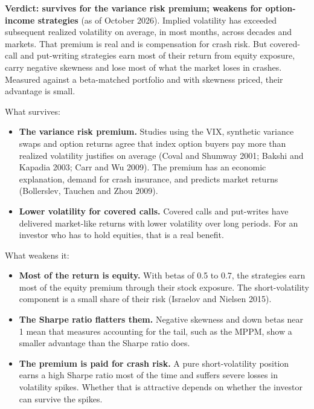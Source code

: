 \begin{callout}
\textbf{Verdict: survives for the variance risk premium; weakens for option-income strategies} (as of October 2026). Implied volatility has exceeded subsequent realized volatility on average, in most months, across decades and markets. That premium is real and is compensation for crash risk. But covered-call and put-writing strategies earn most of their return from equity exposure, carry negative skewness and lose most of what the market loses in crashes. Measured against a beta-matched portfolio and with skewness priced, their advantage is small.
\end{callout}

What survives:

\begin{itemize}
  \item \textbf{The variance risk premium.} Studies using the VIX, synthetic variance swaps and option returns agree that index option buyers pay more than realized volatility justifies on average (Coval and Shumway 2001; Bakshi and Kapadia 2003; Carr and Wu 2009). The premium has an economic explanation, demand for crash insurance, and predicts market returns (Bollerslev, Tauchen and Zhou 2009).
  \item \textbf{Lower volatility for covered calls.} Covered calls and put-writes have delivered market-like returns with lower volatility over long periods. For an investor who has to hold equities, that is a real benefit.
\end{itemize}

What weakens it:

\begin{itemize}
  \item \textbf{Most of the return is equity.} With betas of 0.5 to 0.7, the strategies earn most of the equity premium through their stock exposure. The short-volatility component is a small share of their risk (Israelov and Nielsen 2015).
  \item \textbf{The Sharpe ratio flatters them.} Negative skewness and down betas near 1 mean that measures accounting for the tail, such as the MPPM, show a smaller advantage than the Sharpe ratio does.
  \item \textbf{The premium is paid for crash risk.} A pure short-volatility position earns a high Sharpe ratio most of the time and suffers severe losses in volatility spikes. Whether that is attractive depends on whether the investor can survive the spikes.
\end{itemize}

